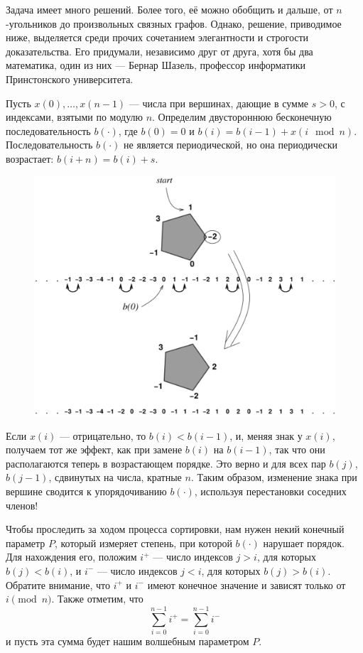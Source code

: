 Задача имеет много решений.
Более того, её можно обобщить и дальше, от $n$-угольников до произвольных связных графов.
Однако, решение, приводимое ниже, выделяется среди прочих сочетанием элегантности и строгости доказательства.
Его придумали, независимо друг от друга, хотя бы два математика, один из них --- Бернар Шазель, профессор информатики Принстонского университета. %

\medskip

Пусть $x(0),\dots,x(n-1)$ --- числа при вершинах, дающие в сумме $s > 0$, с индексами, взятыми по модулю $n$.
Определим двустороннюю бесконечную последовательность
$b(\cdot)$, где $b(0) = 0$ и $b(i) = b(i -1) + x(i \mod{n})$.
Последовательность $b(\cdot)$ не является периодической, но она периодически возрастает: $b(i + n) = b(i) + s$.

\begin{figure}
\centering
\includegraphics[scale=0.5]{Figs/Algorithms/sort}
\end{figure}

Если $x(i)$ --- отрицательно, то $b(i) < b(i-1)$, и, меняя знак у $x(i)$, получаем тот же эффект, как при замене $b(i)$ на $b(i - 1)$, так что они располагаются теперь в возрастающем порядке.
Это верно и для всех пар $b(j)$, $b(j - 1)$, сдвинутых на числа, кратные $n$.
Таким образом, изменение знака при вершине сводится к упорядочиванию $b(\cdot)$, используя перестановки соседних членов!

Чтобы проследить за ходом процесса сортировки, нам нужен некий конечный параметр $P$, который измеряет степень, при которой $b(\cdot)$ нарушает порядок. %
Для нахождения его, положим $i^+$ --- число индексов $j > i$, для которых $b(j) < b(i)$, и $i^-$ --- число индексов $j < i$, для которых $b(j) > b(i)$.
Обратите внимание, что $i^+$ и $i^-$ имеют конечное значение и зависят только от $i \pmod n$.
Также отметим, что 
\[\sum_{i=0}^{n-1}i^+=\sum_{i=0}^{n-1}i^-\]
и пусть эта сумма будет нашим волшебным параметром $P$.

